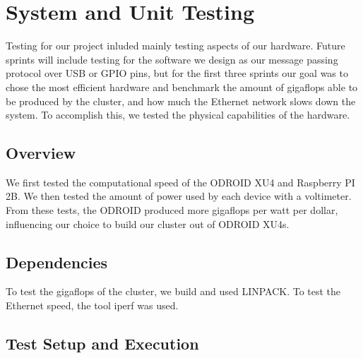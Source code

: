 

\chapter{System  and Unit Testing}
Testing for our project inluded mainly testing aspects of our hardware. Future sprints will include testing for the software we design as our message passing protocol over USB or GPIO pins, but for the first three sprints our goal was to chose the most efficient hardware and benchmark the amount of gigaflops able to be produced by the cluster, and how much the Ethernet network slows down the system. To accomplish this, we tested the physical capabilities of the hardware.

\section{Overview}


We first tested the computational speed of the ODROID XU4 and Raspberry PI 2B. We then tested the amount of power used by each device with a voltimeter. From these tests, the ODROID produced more gigaflops per watt per dollar, influencing our choice to build our cluster out of ODROID XU4s.

\section{Dependencies}
To test the gigaflops of the cluster, we build and used LINPACK. To test the Ethernet speed, the tool iperf was used.

\section{Test Setup and Execution}

